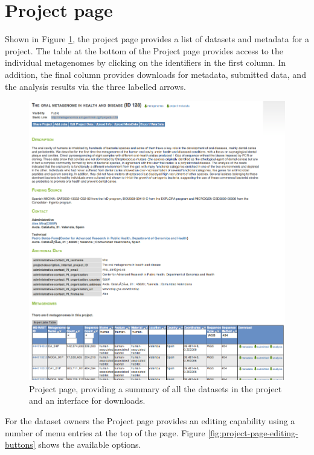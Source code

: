 \documentclass[12pt,fullpage]{report}
\begin{document}
\section{Project page}
Shown in Figure \ref{fig:project-page}, the project page provides a list of datasets and metadata for a project.
The table at the bottom of the Project page provides access to the individual metagenomes by clicking on the identifiers in the first column. In addition, the final column provides downloads for metadata, submitted data, and the analysis results via the three labelled arrows.

\begin{figure}
\begin{center}
\includegraphics[width=6in]{Images/project-page.png}
\end{center}
\caption{
Project page, providing a summary of all the datasets in the project and an interface for downloads.
}
\label{fig:project-page}
\end{figure}

For the dataset owners the Project page provides an editing capability using a number of menu entries at the top of the page. Figure \ref{fig:project-page-editing-buttons} shows the available options.
\end{document}
